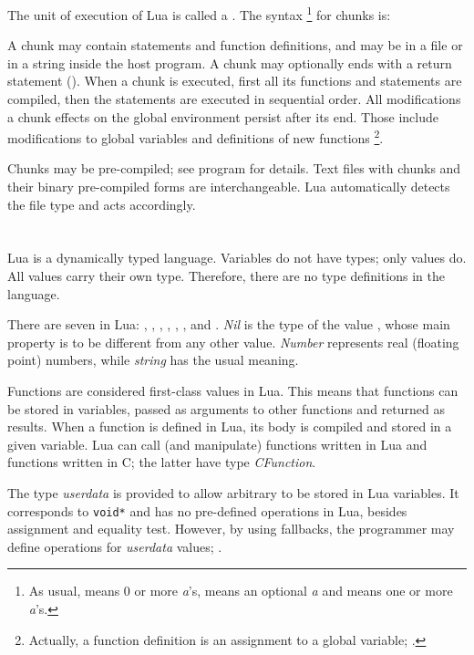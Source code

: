 The unit of execution of Lua is called a .
The syntax%
\footnote{As usual,  means 0 or more {\em a\/}'s,
 means an optional {\em a} and  means
one or more {\em a\/}'s.}
for chunks is:
\begin{Produc}
\end{Produc}%
A chunk may contain statements and function definitions,
and may be in a file or in a string inside the host program.
A chunk may optionally ends with a return statement ().
When a chunk is executed, first all its functions and statements are compiled,
then the statements are executed in sequential order.
All modifications a chunk effects on the global environment persist
after its end.
Those include modifications to global variables and definitions
of new functions%
\footnote{Actually, a function definition is an
assignment to a global variable; .}.

Chunks may be pre-compiled; see program  for details.
Text files with chunks and their binary pre-compiled forms
are interchangeable.
Lua automatically detects the file type and acts accordingly.

\section{} \label{TypesSec}

Lua is a dynamically typed language.
Variables do not have types; only values do.
All values carry their own type.
Therefore, there are no type definitions in the language.

There are seven  in Lua: , ,
, , , ,
and .
{\em Nil} is the type of the value \nil,
whose main property is to be different from any other value.
{\em Number} represents real (floating point) numbers,
while {\em string} has the usual meaning.

Functions are considered first-class values in Lua.
This means that functions can be stored in variables,
passed as arguments to other functions and returned as results.
When a function is defined in Lua, its body is compiled and stored
in a given variable.
Lua can call (and manipulate) functions written in Lua and
functions written in C; the latter have type {\em CFunction\/}.

The type {\em userdata} is provided to allow
arbitrary  to be stored in Lua variables.
It corresponds to \verb'void*' and has no pre-defined operations in Lua,
besides assignment and equality test.
However, by using fallbacks, the programmer may define operations
for {\em userdata} values; .

